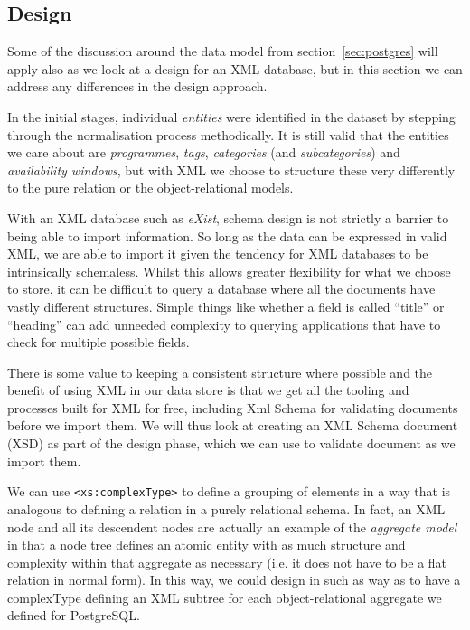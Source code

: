 \documentclass[11pt,a4paper]{article}
\begin{document}
\subsection{Design}

Some of the discussion around the data model from section~\ref{sec:postgres}
will apply also as we look at a design for an XML database, but
in this section we can address any differences in the design approach.

In the initial stages, individual \emph{entities} were identified in the
dataset by stepping through the normalisation process methodically. It
is still valid that the entities we care about are \emph{programmes},
\emph{tags}, \emph{categories} (and \emph{subcategories}) and
\emph{availability windows}, but with XML we choose to structure these
very differently to the pure relation or the object-relational models.

With an XML database such as \emph{eXist}, schema design is not strictly
a barrier to being able to import information. So long as the data can
be expressed in valid XML, we are able to import it given the tendency
for XML databases to be intrinsically schemaless. Whilst this allows
greater flexibility for what we choose to store, it can be difficult
to query a database where all the documents have vastly different structures.
Simple things like whether a field is called ``title'' or ``heading''
can add unneeded complexity to querying applications that have to check
for multiple possible fields.

There is some value to keeping a consistent structure where possible
and the benefit of using XML in our data store is that we get all
the tooling and processes built for XML for free, including Xml Schema for
validating documents before we import them. We will thus look at creating
an XML Schema document (XSD) as part of the design phase, which we can
use to validate document as we import them.

We can use \lstinline|<xs:complexType>| to define a grouping of elements
in a way that is analogous to defining a relation in a purely relational
schema. In fact, an XML node and all its descendent nodes are actually an
example of the \emph{aggregate model} in that a node tree defines an
atomic entity with as much structure and complexity within that
aggregate as necessary (i.e. it does not have to be a flat relation in
normal form). In this way, we could design in such as way as to have
a complexType defining an XML subtree for each object-relational aggregate
we defined for PostgreSQL.
\end{document}
